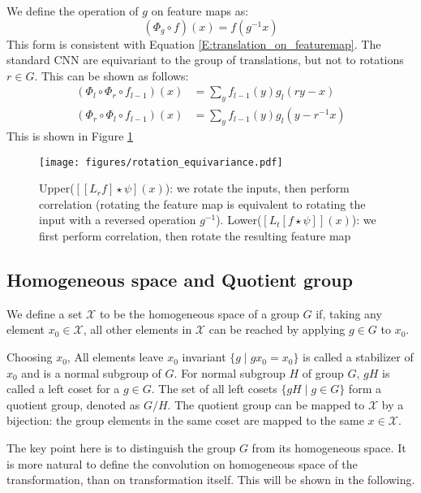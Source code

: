 \documentclass{IEEEtran}
\newcommand{\calx}{\mathcal{X}}
\begin{document}
We define the operation of $g$ on feature maps as: 
\begin{equation}
    \label{E:g_on_featuremap}
    (\Phi_g \circ f) (x) = f(g^{-1}x)
\end{equation}
This form is consistent with Equation \eqref{E:translation_on_featuremap}.
The standard CNN are equivariant to the group of translations, but not to rotations $r\in G$. This can be shown as follows:
\begin{align*}
    (\Phi_l \circ \Phi_r \circ f_{l-1}) (x) &= \sum_{y} f_{l-1}(y) g_l(ry-x) \\
    (\Phi_r \circ \Phi_l \circ f_{l-1}) (x) &= \sum_{y} f_{l-1}(y) g_l(y-r^{-1}x)
\end{align*}
This is shown in Figure \ref{F:rotation_is_not_equivariance}
\begin{figure}[h!]
    \centering
    \texttt{[image: figures/rotation\_equivariance.pdf]}
    \caption{
        Upper($[[L_r f]\star \psi] (x)$): we rotate the inputs, then perform correlation (rotating the feature map is equivalent to rotating the input with a reversed operation $g^{-1}$).
        Lower($[L_t[f\star \psi] ] (x)$): we first perform correlation, then rotate the resulting feature map }
    \label{F:rotation_is_not_equivariance}
\end{figure}

\subsection*{Homogeneous space and Quotient group}
We define a set $\calx$ to be the homogeneous space of a group $G$ if, taking any element $x_0\in \calx$,
all other elements in $\calx$ can be reached by applying $g\in G$ to $x_0$. 

Choosing $x_0$, All elements leave $x_0$ invariant $\{g\mid gx_0 = x_0\}$ is called a stabilizer of $x_0$ and is 
a normal subgroup of $G$. 
For normal subgroup $H$ of group $G$, $gH$ is called a left coset for a $g\in G$. 
The set of all left cosets $\{gH\mid g \in G\}$ form a quotient group, denoted as $G/H$.
The quotient group can be mapped to $\calx$ by a bijection: 
the group elements in the same coset are mapped to the same $x\in \calx$.

The key point here is to distinguish the group $G$ from its homogeneous space. It is more natural to define 
the convolution on homogeneous space of the transformation, than on transformation itself. This will be 
shown in the following.
\end{document}

